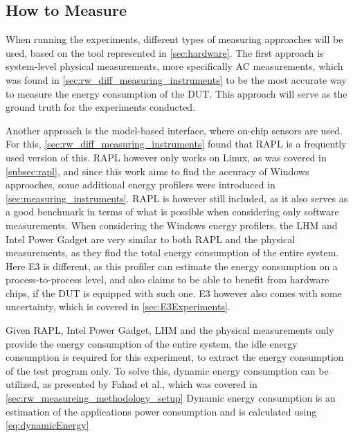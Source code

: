\subsection{How to Measure}\label{subsec:how_to_measure}

When running the experiments, different types of measuring approaches will be used, based on the tool represented in \cref{sec:hardware}. The first approach is system-level physical measurements, more specifically AC measurements, which was found in \cref{sec:rw_diff_measuring_instruments} to be the most accurate way to measure the energy consumption of the DUT. This approach will serve as the ground truth for the experiments conducted.

Another approach is the model-based interface, where on-chip sensors are used. For this, \cref{sec:rw_diff_measuring_instruments} found that RAPL is a frequently used version of this. RAPL however only works on Linux, as was covered in \cref{subsec:rapl}, and since this work aims to find the accuracy of Windows approaches, some additional energy profilers were introduced in \cref{sec:measuring_instruments}. RAPL is however still included, as it also serves as a good benchmark in terms of what is possible when considering only software measurements. When considering the Windows energy profilers, the LHM and Intel Power Gadget are very similar to both RAPL and the physical measurements, as they find the total energy consumption of the entire system. Here E3 is different, as this profiler can estimate the energy consumption on a process-to-process level, and also claims to be able to benefit from hardware chips, if the DUT is equipped with such one.\cite*{E3WinHec} E3 however also comes with some uncertainty, which is covered in \cref{sec:E3Experiments}.

Given RAPL, Intel Power Gadget, LHM and the physical measurements only provide the energy consumption of the entire system, the idle energy consumption is required for this experiment, to extract the energy consumption of the test program only. To solve this, dynamic energy consumption can be utilized, as presented by Fahad et al.\cite{fahad2019comparative}, which was covered in \cref{sec:rw_measureing_methodology_setup} Dynamic energy consumption is an estimation of the applications power consumption and is calculated using \cref{eq:dynamicEnergy}



